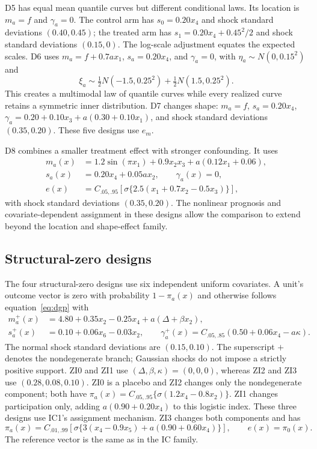 D5 has equal mean quantile curves but different conditional laws. Its location is $m_a=f$ and $\gamma_a=0$. The control arm has $s_0=0.20x_4$ and shock standard deviations $(0.40,0.45)$; the treated arm has $s_1=0.20x_4+0.45^2/2$ and shock standard deviations $(0.15,0)$. The log-scale adjustment equates the expected scales. D6 uses $m_a=f+0.7ax_1$, $s_a=0.20x_4$, and $\gamma_a=0$, with $\eta_a\sim N(0,0.15^2)$ and
\[
 \xi_a\sim\tfrac12 N(-1.5,0.25^2)+\tfrac12 N(1.5,0.25^2).
\]
This creates a multimodal law of quantile curves while every realized curve retains a symmetric inner distribution. D7 changes shape: $m_a=f$, $s_a=0.20x_4$, $\gamma_a=0.20+0.10x_3+a(0.30+0.10x_1)$, and shock standard deviations $(0.35,0.20)$. These five designs use $e_m$.

D8 combines a smaller treatment effect with stronger confounding. It uses
\begin{align*}
 m_a(x)&=1.2\sin(\pi x_1)+0.9x_2x_3+a(0.12x_1+0.06),\\
 s_a(x)&=0.20x_4+0.05ax_2,\qquad \gamma_a(x)=0,\\
 e(x)&=C_{.05,.95}[\sigma\{2.5(x_1+0.7x_2-0.5x_3)\}],
\end{align*}
with shock standard deviations $(0.35,0.20)$. The nonlinear prognosis and covariate-dependent assignment in these designs allow the comparison to extend beyond the location and shape-effect family.

\subsection{Structural-zero designs}\label{sec:zi-design}

The four structural-zero designs use six independent uniform covariates. A unit's outcome vector is zero with probability $1-\pi_a(x)$ and otherwise follows equation~\eqref{eq:dgp} with
\begin{align*}
 m_a^+(x)&=4.80+0.35x_2-0.25x_4+a(\Delta+\beta x_2),\\
 s_a^+(x)&=0.10+0.06x_6-0.03x_2,\qquad
 \gamma_a^+(x)=C_{.05,.85}(0.50+0.06x_4-a\kappa).
\end{align*}
The normal shock standard deviations are $(0.15,0.10)$. The superscript $+$ denotes the nondegenerate branch; Gaussian shocks do not impose a strictly positive support. ZI0 and ZI1 use $(\Delta,\beta,\kappa)=(0,0,0)$, whereas ZI2 and ZI3 use $(0.28,0.08,0.10)$. ZI0 is a placebo and ZI2 changes only the nondegenerate component; both have $\pi_a(x)=C_{.05,.95}\{\sigma(1.2x_4-0.8x_2)\}$. ZI1 changes participation only, adding $a(0.90+0.20x_4)$ to this logistic index. These three designs use IC1's assignment mechanism. ZI3 changes both components and has
\[
 \pi_a(x)=C_{.01,.99}[\sigma\{3(x_4-0.9x_5)+a(0.90+0.60x_4)\}],
 \qquad e(x)=\pi_0(x).
\]
The reference vector is the same as in the IC family.

